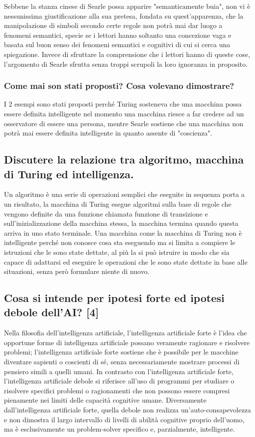 \documentclass[\main/main.tex]{subfiles}
\begin{document}
Sebbene la stanza cinese di Searle possa apparire "semanticamente buia", non vi è nessunissima giustificazione alla sua pretesa, fondata su quest'apparenza, che la manipolazione di simboli secondo certe regole non potrà mai dar luogo a fenomeni semantici, specie se i lettori hanno soltanto una concezione vaga e basata sul buon senso dei fenomeni semantici e cognitivi di cui si cerca una spiegazione. Invece di sfruttare la comprensione che i lettori hanno di queste cose, l'argomento di Searle sfrutta senza troppi scrupoli la loro ignoranza in proposito.

\subsubsection{Come mai son stati proposti? Cosa volevano dimostrare?}
I 2 esempi sono stati proposti perché Turing sosteneva che una macchina possa essere definita intelligente nel momento una macchina riesce a far credere ad un osservatore di essere una persona, mentre Searle sostiene che una macchina non potrà mai essere definita intelligente in quanto assente di "coscienza".

\subsection{Discutere la relazione tra algoritmo, macchina di Turing ed intelligenza.}
Un algoritmo è una serie di operazioni semplici che eseguite in sequenza porta a un risultato, la macchina di Turing esegue algoritmi sulla base di regole che vengono definite da una funzione chiamata funzione di transizione e sull’inizializzazione della macchina stessa, la macchina termina quando questa arriva in uno stato terminale. Una macchina come la macchina di Turing non è intelligente perché non conosce cosa sta eseguendo ma si limita a compiere le istruzioni che le sono state dettate, al più la si può istruire in modo che sia capace di adattarsi ed eseguire le operazioni che le sono state dettate in base alle situazioni, senza però formulare niente di nuovo.

\subsection{Cosa si intende per ipotesi forte ed ipotesi debole dell'AI? [4]}
Nella filosofia dell'intelligenza artificiale, l'intelligenza artificiale forte è l'idea che opportune forme di intelligenza artificiale possano veramente ragionare e risolvere problemi; l'intelligenza artificiale forte sostiene che è possibile per le macchine diventare sapienti o coscienti di sé, senza necessariamente mostrare processi di pensiero simili a quelli umani.
In contrasto con l'intelligenza artificiale forte, l'intelligenza artificiale debole si riferisce all'uso di programmi per studiare o risolvere specifici problemi o ragionamenti che non possono essere compresi pienamente nei limiti delle capacità cognitive umane. Diversamente dall'intelligenza artificiale forte, quella debole non realizza un'auto-consapevolezza e non dimostra il largo intervallo di livelli di abilità cognitive proprio dell'uomo, ma è esclusivamente un problem-solver specifico e, parzialmente, intelligente.
\end{document}
